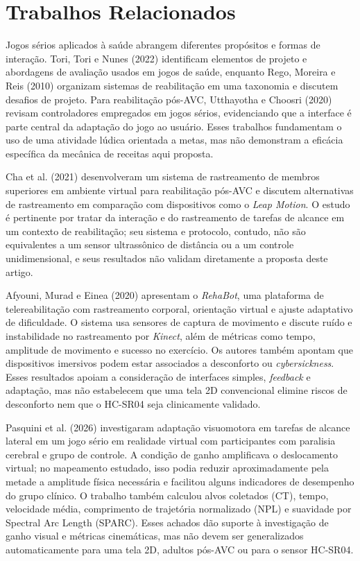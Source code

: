 \documentclass[12pt]{article}
\begin{document}
\section{Trabalhos Relacionados}

Jogos sérios aplicados à saúde abrangem diferentes propósitos e formas de interação. Tori, Tori e Nunes (2022) identificam elementos de projeto e abordagens de avaliação usados em jogos de saúde, enquanto Rego, Moreira e Reis (2010) organizam sistemas de reabilitação em uma taxonomia e discutem desafios de projeto. Para reabilitação pós-AVC, Utthayotha e Choosri (2020) revisam controladores empregados em jogos sérios, evidenciando que a interface é parte central da adaptação do jogo ao usuário. Esses trabalhos fundamentam o uso de uma atividade lúdica orientada a metas, mas não demonstram a eficácia específica da mecânica de receitas aqui proposta.

Cha et al. (2021) desenvolveram um sistema de rastreamento de membros superiores em ambiente virtual para reabilitação pós-AVC e discutem alternativas de rastreamento em comparação com dispositivos como o \textit{Leap Motion}. O estudo é pertinente por tratar da interação e do rastreamento de tarefas de alcance em um contexto de reabilitação; seu sistema e protocolo, contudo, não são equivalentes a um sensor ultrassônico de distância ou a um controle unidimensional, e seus resultados não validam diretamente a proposta deste artigo.

Afyouni, Murad e Einea (2020) apresentam o \textit{RehaBot}, uma plataforma de telereabilitação com rastreamento corporal, orientação virtual e ajuste adaptativo de dificuldade. O sistema usa sensores de captura de movimento e discute ruído e instabilidade no rastreamento por \textit{Kinect}, além de métricas como tempo, amplitude de movimento e sucesso no exercício. Os autores também apontam que dispositivos imersivos podem estar associados a desconforto ou \textit{cybersickness}. Esses resultados apoiam a consideração de interfaces simples, \textit{feedback} e adaptação, mas não estabelecem que uma tela 2D convencional elimine riscos de desconforto nem que o HC-SR04 seja clinicamente validado.

Pasquini et al. (2026) investigaram adaptação visuomotora em tarefas de alcance lateral em um jogo sério em realidade virtual com participantes com paralisia cerebral e grupo de controle. A condição de ganho amplificava o deslocamento virtual; no mapeamento estudado, isso podia reduzir aproximadamente pela metade a amplitude física necessária e facilitou alguns indicadores de desempenho do grupo clínico. O trabalho também calculou alvos coletados (CT), tempo, velocidade média, comprimento de trajetória normalizado (NPL) e suavidade por Spectral Arc Length (SPARC). Esses achados dão suporte à investigação de ganho visual e métricas cinemáticas, mas não devem ser generalizados automaticamente para uma tela 2D, adultos pós-AVC ou para o sensor HC-SR04.
\end{document}
